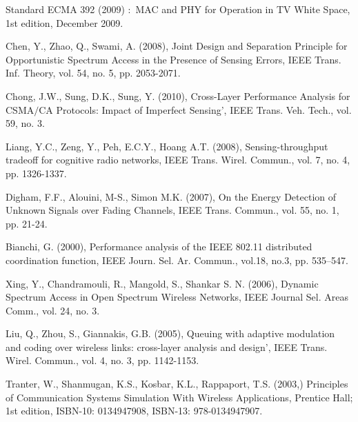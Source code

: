 \documentclass
[journal,11pt,draftclsnofoot,onecolumn,doublespace]{tETN2e}
\begin{document}
\begin{thebibliography}{9}
Standard ECMA 392 (2009) $:$ MAC and PHY for Operation in TV White Space, 1st edition, December 2009.

Chen, Y., Zhao, Q., Swami, A. (2008), Joint Design and Separation Principle for Opportunistic Spectrum Access in the Presence of Sensing Errors, IEEE Trans. Inf. Theory, vol. 54, no. 5, pp. 2053-2071.

Chong, J.W., Sung, D.K., Sung, Y. (2010), Cross-Layer Performance Analysis for CSMA$/$CA Protocols: Impact of Imperfect Sensing’, IEEE Trans. Veh. Tech., vol. 59, no. 3.   

Liang, Y.C., Zeng, Y., Peh, E.C.Y., Hoang A.T. (2008), Sensing-throughput tradeoff for cognitive radio networks, IEEE Trans. Wirel. Commun., vol. 7, no. 4, pp. 1326-1337.

Digham, F.F., Alouini, M-S., Simon M.K. (2007), On the Energy Detection of Unknown Signals over Fading Channels, IEEE Trans. Commun., vol. 55, no. 1, pp. 21-24.

Bianchi, G. (2000), Performance analysis of the IEEE 802.11 distributed coordination function, IEEE Journ. Sel. Ar. Commun.,  vol.18, no.3, pp. 535–547.

Xing, Y., Chandramouli, R., Mangold, S., Shankar S. N. (2006), Dynamic Spectrum Access in Open Spectrum Wireless Networks, IEEE Journal Sel. Areas Comm., vol. 24, no. 3.

Liu, Q., Zhou, S., Giannakis, G.B. (2005), Queuing with adaptive modulation and coding over wireless links: cross-layer analysis and design’, IEEE Trans. Wirel. Commun., vol. 4, no. 3, pp. 1142-1153.

Tranter, W., Shanmugan, K.S., Kosbar, K.L., Rappaport, T.S. (2003,) Principles of Communication Systems Simulation With Wireless Applications, Prentice Hall; 1st edition, ISBN-10: 0134947908, ISBN-13: 978-0134947907. 

\end{thebibliography}
\end{document}
